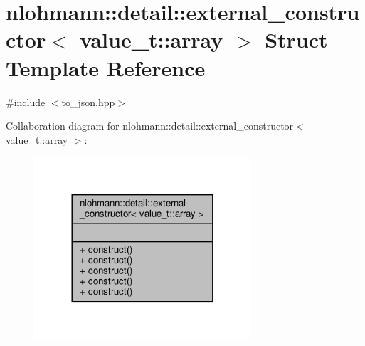 \hypertarget{structnlohmann_1_1detail_1_1external__constructor_3_01value__t_1_1array_01_4}{}\section{nlohmann\+:\+:detail\+:\+:external\+\_\+constructor$<$ value\+\_\+t\+:\+:array $>$ Struct Template Reference}
\label{structnlohmann_1_1detail_1_1external__constructor_3_01value__t_1_1array_01_4}


{\ttfamily \#include $<$to\+\_\+json.\+hpp$>$}



Collaboration diagram for nlohmann\+:\+:detail\+:\+:external\+\_\+constructor$<$ value\+\_\+t\+:\+:array $>$\+:\nopagebreak
\begin{figure}[H]
\begin{center}
\leavevmode
\includegraphics[width=228pt]{structnlohmann_1_1detail_1_1external__constructor_3_01value__t_1_1array_01_4__coll__graph}
\end{center}
\end{figure}
